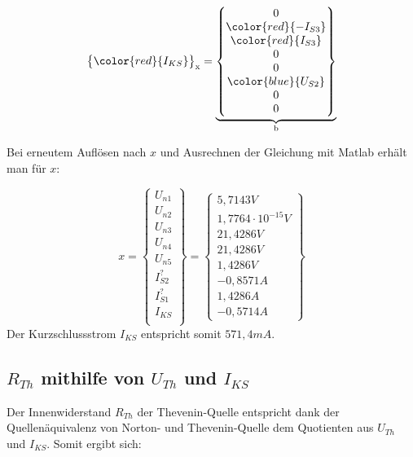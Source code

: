 \documentclass[11pt]{scrartcl}
\begin{document}
\begin{align*}
{\begin{Bmatrix}
                                                                             \color{red}{I_{KS}}
                                                                           \end{Bmatrix}}_{\text{x}} =
  \underbrace{\begin{Bmatrix}
      0 \\
      \color{red}{-I_{S3}} \\
      \color{red}{I_{S3}}\\
      0 \\
      0 \\
      \color{blue}{U_{S2}} \\
      0 \\
      0
    \end{Bmatrix}}_{\text{b}}
\end{align*}

Bei erneutem Auflösen nach $x$ und Ausrechnen der Gleichung mit Matlab erhält man für $x$:

\begin{equation*}
  x = \begin{Bmatrix}
    U_{n1} \\
    U_{n2} \\
    U_{n3} \\
    U_{n4} \\
    U_{n5} \\
    I_{S2}^? \\
    I_{S1}^? \\
    I_{KS} \\
  \end{Bmatrix} =
  \begin{Bmatrix}
    5,7143 \unit{V} \\
    1,7764 \cdot 10^{-15} \unit{V} \\
    21,4286 \unit{V} \\
    21,4286 \unit{V} \\
    1,4286 \unit{V} \\
    -0,8571 \unit{A} \\
    1,4286 \unit{A} \\
    -0,5714 \unit{A}
    \end{Bmatrix}
\end{equation*}
Der Kurzschlussstrom $I_{KS}$ entspricht somit $571,4 \unit{mA}$.

\subsection{$R_{Th}$ mithilfe von $U_{Th}$ und $I_{KS}$}\label{sec:var1}
Der Innenwiderstand $R_{Th}$ der Thevenin-Quelle entspricht dank der Quellenäquivalenz von Norton- und Thevenin-Quelle
dem Quotienten aus $U_{Th}$ und $I_{KS}$.
Somit ergibt sich:
\end{document}
